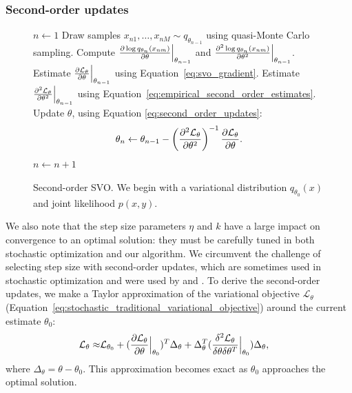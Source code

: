  \subsubsection{Second-order updates}
 \label{section:second_order_updates}
\begin{figure}
     \begin{algorithmic}[1]
    \setlength{\topsep}{1pt}
    \setlength{\itemsep}{2pt}
    \setlength{\parskip}{1pt}
    \setlength{\parsep}{1pt}

     \STATE $n \gets 1$
    \STATE Draw samples $x_{n1}, \ldots, x_{nM} \sim q_{\theta_{n - 1}}$ using quasi-Monte Carlo sampling.
    \STATE Compute $\frac{\partial \log q_{\theta_n}(x_{nm})}{\partial \theta} \Bigr|_{\theta_{n-1}}$ and
    $\frac{\partial^2 \log q_{\theta_n}(x_{nm})}{\partial {\theta}^2} \Bigr|_{\theta_{n-1}}$. %
    \STATE Estimate $\frac{\partial \mathcal{L}_\theta }{\partial \theta} \Bigr|_{\theta_{n-1}}$ using Equation~\ref{eq:svo_gradient}.
    \STATE Estimate $\frac{\partial^2 \mathcal{L}_\theta }{\partial {\theta}^2} \Bigr|_{\theta_{n-1}}$ using Equation~\ref{eq:empirical_second_order_estimates}.
    \STATE Update $\theta$, using Equation \ref{eq:second_order_updates}:
        \vspace{-10pt}
	\begin{align*}
     	   \displaystyle \theta_n \gets \theta_{n-1} - \left( 
     	\frac{\partial^2 \mathcal{L}_\theta }{\partial {\theta}^2}
     	\right)^{-1}
     	\frac{\partial \mathcal{L}_\theta }{\partial \theta}.  \end{align*}
    \vspace{-15pt}
    \STATE $n \gets n + 1$ %
    \ENDWHILE
   \end{algorithmic}
     \caption{Second-order SVO. We begin with a variational distribution
       $q_{\theta_0}(x)$ and joint likelihood $p(x, y)$.  }
     \label{fig:second_order_algorithm}
\end{figure}

We also note that the step size parameters $\eta$ and $k$ have a large
impact on convergence to an optimal solution: they must be carefully
tuned in both stochastic optimization and our algorithm. We circumvent
the challenge of selecting step size with second-order updates, which
are sometimes used in stochastic optimization
\cite{robbins:1951,bottou:2004} and were used by
\citet{carbonetto:2009} and \citet{wei:1990}.  To derive the
second-order updates, we make a Taylor approximation of the
variational objective $\mathcal{L}_\theta$
(Equation~\ref{eq:stochastic_traditional_variational_objective}) around the
current estimate $\theta_0$:
\begin{align}
  \mathcal{L}_\theta \approx & \mathcal{L}_{\theta_0} + ( \frac{\partial \mathcal{L}_\theta }{\partial \theta} \Bigr|_{\theta_0} )^T \Delta_\theta
 + \Delta_\theta^T ( \frac{\delta^2 \mathcal{L}_\theta }{\delta \theta \delta \theta^T} \Bigr|_{\theta_0} ) \Delta_\theta, \nonumber
\end{align}
where $\Delta_\theta = \theta - \theta_0$.  This approximation becomes
exact as $\theta_0$ approaches the optimal solution.

